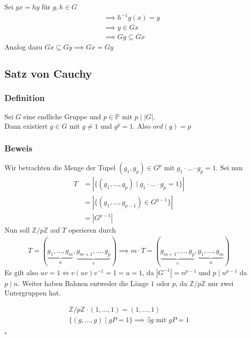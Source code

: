 \documentclass[12pt, german]{article}
\newcommand{\bewiesen}{

\begin{flushright}
		$\square$  \\
\end{flushright}}
\begin{document}
	Sei $gx = hy$ für $g,h \in G$
	\begin{align*}
		&\implies h^{-1}g(x) = y \\
		&\implies y \in Gx \\
		&\implies Gy \subseteq Gx
	\end{align*}
	Analog dazu $Gx \subseteq Gy \implies Gx = Gy$


\subsection{Satz von Cauchy}		
\subsubsection{Definition}
	Sei $G$ eine endliche Gruppe und $p \in \mathbb P$ mit $p \mid |G|$. \\
	Dann existiert $g \in G$ mit $g \not = 1$ und $ g^p = 1$. Also $ord(g)= p$
\subsubsection{Beweis}
Wir betrachten die Menge der Tupel $(g_1, g_p) \in G^p$ mit $g_1 \cdot \ldots \cdot g_p = 1$. 
Sei nun 
\begin{align*}
	T &= |\{(g_1, \ldots, g_p) \mid  g_1 \cdot \ldots \cdot g_p = 1 \}| \\
	&= |\{(g_1, \ldots, g_{p-1}) \in G^{p-1} \}| \\
	&= |G^{p-1}|
\end{align*}
Nun soll $\mathbb Z /p\mathbb Z$ auf $T$ operieren durch
 \begin{align*}
	T = (\underbrace{g_1, \ldots, g_m}_{\substack{u}}, \underbrace{g_{m+1}, \ldots, g_p}_{\substack{v}}) \implies m\cdot T = (\underbrace{g_{m+1}, \ldots, g_p}_{\substack{v}}, \underbrace{g_1, \ldots, g_m}_{\substack{u}})
\end{align*}
Es gilt also $uv = 1 \iff v(uv)v^{-1} = 1 = u = 1$, da $|G^{-1}| = n^{p-1}$ und $p \mid n^{p-1} $ da $p \mid n$.
Weiter haben Bahnen entweder die Länge $1$ oder $p$, da $\mathbb Z /p\mathbb Z$ nur zwei Untergruppen hat.

\begin{align*}
\mathbb Z /p\mathbb Z \cdot (1, \ldots, 1) = (1, \ldots, 1) \\
\{(g, \ldots, g) \mid gP= 1 \} \implies \exists g \text{ mit } gP = 1
\end{align*}
\bewiesen
\end{document}
